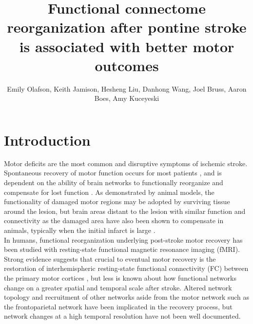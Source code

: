 \documentclass[10pt]{article}
\begin{document}
 
	\sectionfont{\large}
	\title{Functional connectome reorganization after pontine stroke is associated with better motor  	outcomes}
	\maketitle
 	\author{Emily Olafson, Keith Jamison, Hesheng Liu, Danhong Wang, Joel Bruss, Aaron Boes, Amy Kuceyeski}%
	
	\section*{Introduction}
	Motor deficits are the most common and disruptive symptoms of ischemic stroke. Spontaneous recovery of motor function occurs for most patients \cite{Duncan2000-uj}, and is dependent on the ability of brain networks to functionally reorganize and compensate for lost function \cite{Corbetta2005-ra}. As demonstrated by animal models, the functionality of damaged motor regions may be adopted by surviving tissue around the lesion, but brain areas distant to the lesion with similar function and connectivity as the damaged area have also been shown to compensate in animals, typically when the initial infarct is large \cite{Winship2009-af, Adam2020-jk, Murata2015-ss, Brown2009-jn}.
	\\
	
	In humans, functional reorganization underlying post-stroke motor recovery has been studied with resting-state functional magnetic resonance imaging (fMRI). Strong evidence suggests that crucial to eventual motor recovery is the restoration of interhemispheric resting-state functional connectivity (FC) between the primary motor cortices \cite{Carter2010-er, Urbin2014-iq, Rehme2013-ap}, but less is known about how functional networks change on a greater spatial and temporal scale after stroke. Altered network topology \cite{Wang2010-or} and recruitment of other networks aside from the motor network such as the frontoparietal network \cite{Hordacre2021-ct, Pool2018-px} have been implicated in the recovery process, but network changes at a high temporal resolution have not been well documented.
	\\
	
\end{document}
